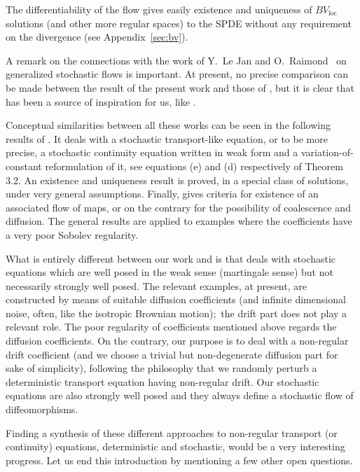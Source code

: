 \documentclass[a4paper,11pt]{article}
\begin{document}
The differentiability of the flow gives easily existence and
uniqueness of $BV_{\text{loc}}$ solutions (and other more regular
spaces) to the SPDE without any requirement on the divergence (see
Appendix~\ref{sec:bv}).

\medskip A remark on the connections with the work of Y.~Le Jan and
O.~Raimond~\cite{LR} on generalized stochastic flows is important. At
present, no precise comparison can be made between the result of the present
work and those of \cite{LR}, but it is clear that \cite{LR} has been a
source of inspiration for us, like \cite{Ambrosio, DiPernaLions}.

Conceptual similarities between all these works can be seen in the following
results of \cite{LR}. It deals with a stochastic transport-like equation, or
to be more precise, a stochastic continuity equation written in weak form
and a variation-of-constant reformulation of it, see equations (e) and (d)
respectively of Theorem 3.2. An existence and uniqueness result is proved,
in a special class of solutions, under very general assumptions. Finally,
\cite{LR} gives criteria for existence of an associated flow of maps, or on
the contrary for the possibility of coalescence and diffusion. The general
results are applied to examples where the coefficients have a very poor
Sobolev regularity.

What is entirely different between our work and \cite{LR} is that \cite{LR}
deals with stochastic equations which are well posed in the weak sense
(martingale sense) but not necessarily strongly well posed. The relevant
examples, at present, are constructed by means of suitable diffusion
coefficients (and infinite dimensional noise, often, like the isotropic
Brownian motion);\ the drift part does not play a relevant role. The poor
regularity of coefficients mentioned above regards the diffusion
coefficients. On the contrary, our purpose is to deal with a non-regular
drift coefficient (and we choose a trivial but non-degenerate diffusion part
for sake of simplicity), following the philosophy that we randomly perturb a
deterministic transport equation having non-regular drift. Our stochastic
equations are also strongly well posed and they always define a stochastic
flow of diffeomorphisms.

Finding a synthesis of these different approaches to non-regular transport
(or continuity) equations, deterministic and stochastic, would be a very
interesting progress. Let us end this introduction by mentioning a few other
open questions.
\end{document}
